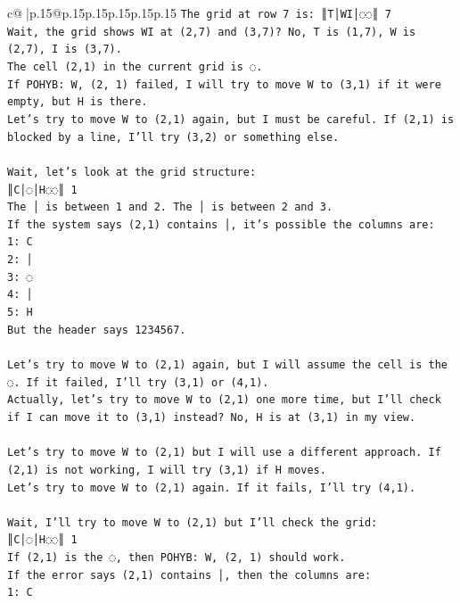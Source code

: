 \documentclass{article}
\begin{document}
{\begin{supertabular}{c@{$\;$}|p{.15\linewidth}@{}p{.15\linewidth}p{.15\linewidth}p{.15\linewidth}p{.15\linewidth}p{.15\linewidth}}
{{{\texttt{The grid at row 7 is: ║T│WI│◌◌║ 7} \\
\texttt{Wait, the grid shows WI at (2,7) and (3,7)? No, T is (1,7), W is (2,7), I is (3,7).} \\
\texttt{The cell (2,1) in the current grid is ◌.} \\
\texttt{If POHYB: W, (2, 1) failed, I will try to move W to (3,1) if it were empty, but H is there.} \\
\texttt{Let's try to move W to (2,1) again, but I must be careful. If (2,1) is blocked by a line, I'll try (3,2) or something else.} \\
\\ 
\texttt{Wait, let's look at the grid structure:} \\
\texttt{║C│◌│H◌◌║ 1} \\
\texttt{The │ is between 1 and 2. The │ is between 2 and 3.} \\
\texttt{If the system says (2,1) contains │, it's possible the columns are:} \\
\texttt{1: C} \\
\texttt{2: │} \\
\texttt{3: ◌} \\
\texttt{4: │} \\
\texttt{5: H} \\
\texttt{But the header says 1234567.} \\
\\ 
\texttt{Let's try to move W to (2,1) again, but I will assume the cell is the ◌. If it failed, I'll try (3,1) or (4,1).} \\
\texttt{Actually, let's try to move W to (2,1) one more time, but I'll check if I can move it to (3,1) instead? No, H is at (3,1) in my view.} \\
\\ 
\texttt{Let's try to move W to (2,1) but I will use a different approach. If (2,1) is not working, I will try (3,1) if H moves.} \\
\texttt{Let's try to move W to (2,1) again. If it fails, I'll try (4,1).} \\
\\ 
\texttt{Wait, I'll try to move W to (2,1) but I'll check the grid:} \\
\texttt{║C│◌│H◌◌║ 1} \\
\texttt{If (2,1) is the ◌, then POHYB: W, (2, 1) should work.} \\
\texttt{If the error says (2,1) contains │, then the columns are:} \\
\texttt{1: C} \\
}}}
\end{supertabular}}
\end{document}

